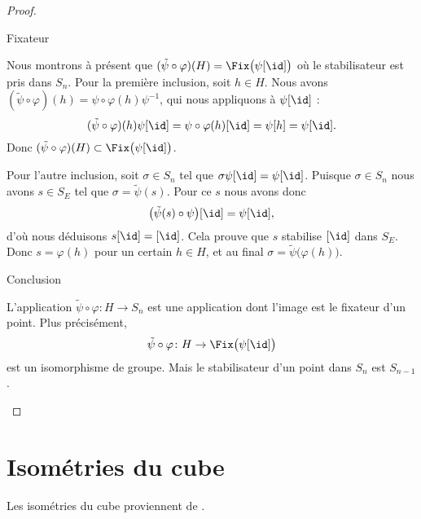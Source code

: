 \begin{proof}
\begin{subproof}
\begin{subproof}
                \item[Fixateur]

                    Nous montrons à présent que \( (\tilde \psi\circ\varphi)(H)=\Fix\big( \psi[\id] \big)\) où le stabilisateur est pris dans \( S_n\). Pour la première inclusion, soit \( h\in H\). Nous avons \( (\tilde \psi\circ\varphi)(h)=\psi\circ\varphi(h)\psi^{-1}\), qui nous appliquons à \( \psi[\id]\) :
                    \begin{equation}
                        (\tilde \psi\circ\varphi)(h)\psi[\id]=\psi\circ\varphi(h)[\id]=\psi[h]=\psi[\id].
                    \end{equation}
                    Donc \( (\tilde \psi\circ\varphi)(H)\subset\Fix\big( \psi[\id] \big)\).

                    Pour l'autre inclusion, soit \( \sigma\in S_n\) tel que \( \sigma\psi[\id]=\psi[\id]\). Puisque \( \sigma\in S_n\) nous avons \( s\in S_E\) tel que \( \sigma=\tilde \psi(s)\). Pour ce \( s\) nous avons donc
                    \begin{equation}
                        \big( \tilde \psi(s)\circ\psi \big)[\id]=\psi[\id],
                    \end{equation}
                    d'où nous déduisons \( s[\id]=[\id]\). Cela prouve que \( s\) stabilise \( [\id]\) dans \( S_E\). Donc \( s=\varphi(h)\) pour un certain \( h\in H\), et au final \( \sigma=\tilde \psi\big( \varphi(h) \big)\).

                \item[Conclusion]

                    L'application \( \tilde \psi\circ\varphi\colon H\to S_n\) est une application dont l'image est le fixateur d'un point. Plus précisément,
                    \begin{equation}
                        \tilde \psi\circ\varphi\colon H\to \Fix\big( \psi[\id] \big)
                    \end{equation}
                    est un isomorphisme de groupe. Mais le stabilisateur d'un point dans \( S_n\) est \( S_{n-1}\).
            \end{subproof}
    \end{subproof}
\end{proof}


\section{Isométries du cube}
\label{SecPVCmkxM}
Les isométries du cube proviennent de \cite{KXjFWKA}.

